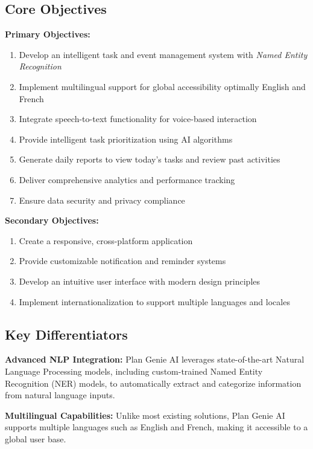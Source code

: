 \documentclass[12pt,a4paper]{article}
\begin{document}
\subsection{Core Objectives}

\textbf{Primary Objectives:}
\begin{enumerate}
    \item Develop an intelligent task and event management system with \textit{Named Entity Recognition}
    \item Implement multilingual support for global accessibility optimally English and French
    \item Integrate speech-to-text functionality for voice-based interaction
    \item Provide intelligent task prioritization using AI algorithms
    \item Generate daily reports to view today's tasks and review past activities
    \item Deliver comprehensive analytics and performance tracking
    \item Ensure data security and privacy compliance
\end{enumerate}

\textbf{Secondary Objectives:}
\begin{enumerate}
    \item Create a responsive, cross-platform application
    \item Provide customizable notification and reminder systems
    \item Develop an intuitive user interface with modern design principles
    \item Implement internationalization to support multiple languages and locales
\end{enumerate}


\subsection{Key Differentiators}

\textbf{Advanced NLP Integration:}
Plan Genie AI leverages state-of-the-art Natural Language Processing models, including custom-trained Named Entity Recognition (NER) models, to automatically extract and categorize information from natural language inputs.

\textbf{Multilingual Capabilities:}
Unlike most existing solutions, Plan Genie AI supports multiple languages such as English and French, making it accessible to a global user base.
\end{document}

